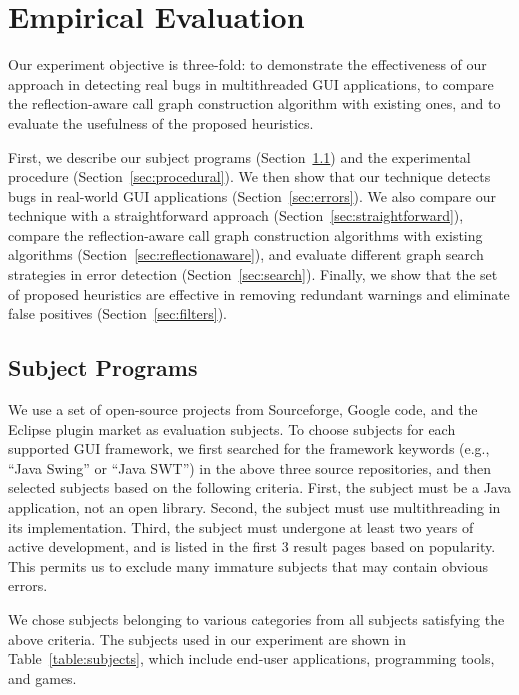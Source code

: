 \section{Empirical Evaluation}
\label{sec:evaluation}

Our experiment objective is three-fold: to demonstrate the effectiveness
of our approach in detecting real bugs in multithreaded GUI applications, to 
compare the reflection-aware call graph construction algorithm
with existing ones, and to evaluate the usefulness of the proposed 
 heuristics.  

First, we describe our subject programs (Section~\ref{sec:subjects}) and the experimental procedure (Section~\ref{sec:procedural}).
We then show that our technique detects bugs in real-world GUI applications (Section~\ref{sec:errors}).
We also compare our technique with
a straightforward approach (Section~\ref{sec:straightforward}),  compare the reflection-aware call graph
construction algorithms with existing algorithms (Section~\ref{sec:reflectionaware}), and
evaluate different graph search strategies in error detection (Section~\ref{sec:search}).
 Finally, we show that the set of proposed heuristics are effective
in removing redundant warnings and eliminate false positives (Section~\ref{sec:filters}). 



\subsection{Subject Programs}
\label{sec:subjects}


We use a set of open-source projects from Sourceforge, Google code, and the Eclipse plugin
market as evaluation subjects. To choose subjects for each supported GUI framework,
we first searched for the framework keywords (e.g., ``Java Swing'' or ``Java SWT'')
in the above three source repositories, and then selected subjects based on the following
criteria. First, the subject must be a Java application, not
an open library. Second, the subject must use multithreading in its implementation.
Third, the subject must undergone at least two years of active development,
and is listed in the first 3 result pages based on popularity. This permits us
to exclude many immature subjects that may contain obvious errors.

We chose subjects belonging to various categories from all subjects satisfying
the above criteria. The subjects used in our experiment are shown in Table~\ref{table:subjects},
which include end-user applications, programming tools, and games. 

